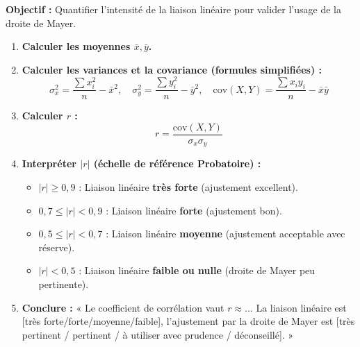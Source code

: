 \documentclass[11pt]{article}
\begin{document}
\begin{methode}
\textbf{Objectif :} Quantifier l'intensité de la liaison linéaire pour valider l'usage de la droite de Mayer.
\begin{enumerate}
    \item \textbf{Calculer les moyennes $\bar{x}, \bar{y}$.}
    \item \textbf{Calculer les variances et la covariance (formules simplifiées) :}
    \[ \sigma_x^2 = \frac{\sum x_i^2}{n} - \bar{x}^2,\quad \sigma_y^2 = \frac{\sum y_i^2}{n} - \bar{y}^2,\quad \text{cov}(X,Y) = \frac{\sum x_i y_i}{n} - \bar{x}\bar{y} \]
    \item \textbf{Calculer $r$ :}
    \[ r = \frac{\text{cov}(X,Y)}{\sigma_x \sigma_y} \]
    \item \textbf{Interpréter $|r|$ (échelle de référence Probatoire) :}
    \begin{itemize}
        \item $|r| \ge 0,9$ : Liaison linéaire \textbf{très forte} (ajustement excellent).
        \item $0,7 \le |r| < 0,9$ : Liaison linéaire \textbf{forte} (ajustement bon).
        \item $0,5 \le |r| < 0,7$ : Liaison linéaire \textbf{moyenne} (ajustement acceptable avec réserve).
        \item $|r| < 0,5$ : Liaison linéaire \textbf{faible ou nulle} (droite de Mayer peu pertinente).
    \end{itemize}
    \item \textbf{Conclure :} « Le coefficient de corrélation vaut $r \approx \dots$ La liaison linéaire est [très forte/forte/moyenne/faible], l'ajustement par la droite de Mayer est [très pertinent / pertinent / à utiliser avec prudence / déconseillé]. »
\end{enumerate}
\end{methode}
\end{document}
